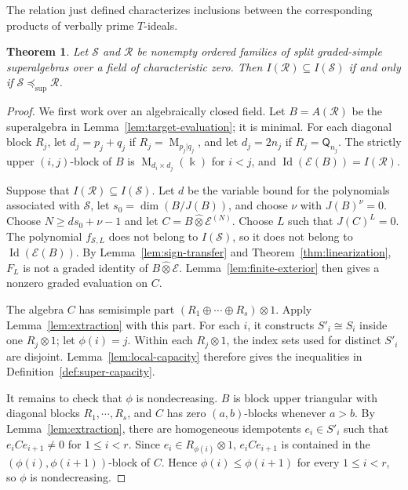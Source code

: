 \documentclass[11pt,reqno]{amsart}
\newcommand{\kk}{\Bbbk}
\newcommand{\E}{\mathcal E}
\newcommand{\Id}{\operatorname{Id}}
\newcommand{\Mat}{\operatorname{M}}
\newcommand{\Qtype}{\mathsf Q}
\newtheorem{theorem}{Theorem}[section]
\theoremstyle{definition}
\theoremstyle{remark}
\numberwithin{equation}{section}
\begin{document}
The relation just defined characterizes inclusions between
the corresponding products of verbally prime $T$-ideals.

\begin{theorem}\label{thm:mixed-capacity}
Let $\mathcal S$ and $\mathcal R$ be nonempty ordered families of split graded-simple superalgebras over a field of characteristic zero. Then
$
I(\mathcal R)\subseteq I(\mathcal S)$ if and only if
 $\mathcal S\preceq_{\mathrm{sup}}\mathcal R$.

\end{theorem}
\begin{proof}

We first work over an algebraically closed field.
Let $B=A(\mathcal R)$ be the superalgebra in
Lemma~\ref{lem:target-evaluation}; it is minimal.
For each diagonal block $R_j$, let $d_j=p_j+q_j$ if
$R_j=\Mat_{p_j|q_j}$, and let $d_j=2n_j$ if $R_j=\Qtype_{n_j}$.
The strictly upper $(i,j)$-block of $B$ is
$\Mat_{d_i\times d_j}(\kk)$ for $i<j$, and
$\Id(\E(B))=I(\mathcal R)$.

Suppose that $I(\mathcal R)\subseteq I(\mathcal S)$. Let $d$ be the variable bound for the polynomials associated with $\mathcal S$, let $s_0=\dim(B/J(B))$, and choose $\nu$ with $J(B)^\nu=0$. Choose $N\geq ds_0+\nu-1$ and let $C=B\mathbin{\widehat{\otimes}}\E^{(N)}$. Choose $L$ such that $J(C)^L=0$.  The polynomial $f_{\mathcal S,L}$ does not belong to $I(\mathcal S)$, so it does not belong to $\Id(\E(B))$. By Lemma~\ref{lem:sign-transfer} and Theorem~\ref{thm:linearization}, $F_L$ is not a graded identity of $B\mathbin{\widehat{\otimes}}\E$. Lemma~\ref{lem:finite-exterior} then gives a nonzero graded evaluation on $C$.

The algebra $C$ has
semisimple part $(R_1\oplus\cdots\oplus R_s)\otimes1$.
Apply Lemma~\ref{lem:extraction} with this  part.
For each $i$, it constructs $S'_i\cong S_i$ inside one
$R_j\otimes1$; let $\phi(i)=j$.
Within each $R_j\otimes1$, the index sets used for distinct
$S'_i$ are disjoint.
Lemma~\ref{lem:local-capacity} therefore gives the inequalities
in Definition~\ref{def:super-capacity}.

It remains to check that $\phi$ is nondecreasing.
 $B$ is block upper triangular with diagonal blocks
$R_1,\cdots,R_s$, and
$C$ has zero $(a,b)$-blocks whenever $a>b$.
By Lemma~\ref{lem:extraction}, there are homogeneous idempotents
$e_i\in S'_i$ such that $e_iCe_{i+1}\ne0$ for $1\leq i<r$.
Since $e_i\in R_{\phi(i)}\otimes1$,  $e_iCe_{i+1}$
is contained in the $(\phi(i),\phi(i+1))$-block of $C$.
Hence $\phi(i)\leq\phi(i+1)$ for every $1\leq i<r$,
so $\phi$ is nondecreasing.


\end{proof}
\end{document}
